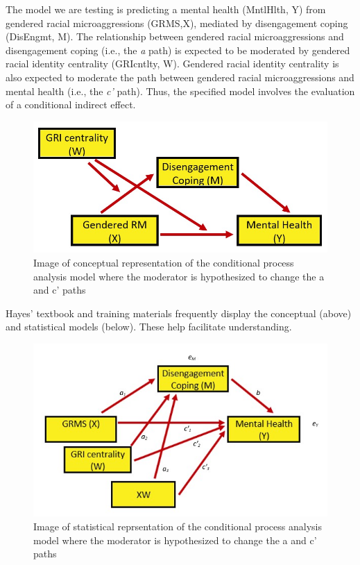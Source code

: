 \documentclass[
]{book}
\begin{document}
The model we are testing is predicting a mental health (MntlHlth, Y) from gendered racial microaggressions (GRMS,X), mediated by disengagement coping (DisEngmt, M). The relationship between gendered racial microaggressions and disengagement coping (i.e., the \emph{a} path) is expected to be moderated by gendered racial identity centrality (GRIcntlty, W). Gendered racial identity centrality is also expected to moderate the path between gendered racial microaggressions and mental health (i.e., the \emph{c'} path). Thus, the specified model involves the evaluation of a conditional indirect effect.

\begin{figure}
\centering
\includegraphics{images/ModMed/LewisModMed.jpg}
\caption{Image of conceptual representation of the conditional process analysis model where the moderator is hypothesized to change the a and c' paths}
\end{figure}

Hayes' \citeyearpar{hayes_introduction_2018} textbook and training materials frequently display the conceptual (above) and statistical models (below). These help facilitate understanding.

\begin{figure}
\centering
\includegraphics{images/ModMed/LewisStatistical.jpg}
\caption{Image of statistical reprsentation of the conditional process analysis model where the moderator is hypothesized to change the a and c' paths}
\end{figure}
\end{document}
